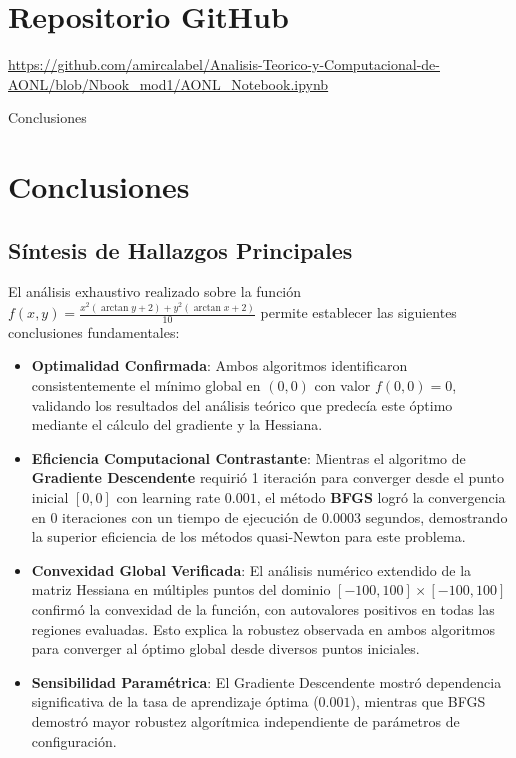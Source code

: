 \documentclass[11pt, a4paper, twocolumn]{beamer}
\begin{document}
	\section*{Repositorio GitHub}
	\url{https://github.com/amircalabel/Analisis-Teorico-y-Computacional-de-AONL/blob/Nbook_mod1/AONL_Notebook.ipynb}
	\newpage
	\begin{frame}{Conclusiones}
		\section{Conclusiones}
		
		\subsection{Síntesis de Hallazgos Principales}
		
		El análisis exhaustivo realizado sobre la función $f(x,y) = \frac{x^2 (\arctan y + 2) + y^2 (\arctan x + 2)}{10}$ permite establecer las siguientes conclusiones fundamentales:
	\end{frame}
		\begin{itemize}
			\item \textbf{Optimalidad Confirmada}: Ambos algoritmos identificaron consistentemente el mínimo global en $(0,0)$ con valor $f(0,0) = 0$, validando los resultados del análisis teórico que predecía este óptimo mediante el cálculo del gradiente y la Hessiana.
			
			\item \textbf{Eficiencia Computacional Contrastante}: Mientras el algoritmo de \textbf{Gradiente Descendente} requirió 1 iteración para converger desde el punto inicial $[0,0]$ con learning rate $0.001$, el método \textbf{BFGS} logró la convergencia en 0 iteraciones con un tiempo de ejecución de $0.0003$ segundos, demostrando la superior eficiencia de los métodos quasi-Newton para este problema.
			
			\item \textbf{Convexidad Global Verificada}: El análisis numérico extendido de la matriz Hessiana en múltiples puntos del dominio $[-100, 100] \times [-100, 100]$ confirmó la convexidad de la función, con autovalores positivos en todas las regiones evaluadas. Esto explica la robustez observada en ambos algoritmos para converger al óptimo global desde diversos puntos iniciales.
			
			\item \textbf{Sensibilidad Paramétrica}: El Gradiente Descendente mostró dependencia significativa de la tasa de aprendizaje óptima ($0.001$), mientras que BFGS demostró mayor robustez algorítmica independiente de parámetros de configuración.
		\end{itemize}
		
\end{document}
